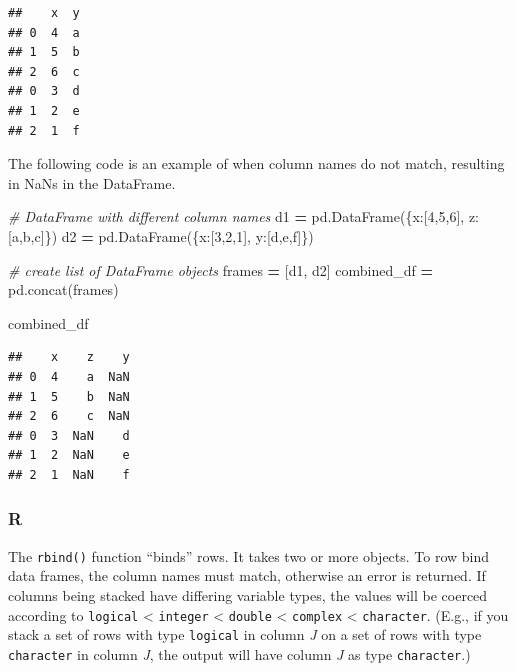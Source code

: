 \documentclass[
]{book}
\newenvironment{Shaded}{\begin{snugshade}}{\end{snugshade}}
\newcommand{\CommentTok}[1]{\textcolor[rgb]{0.56,0.35,0.01}{\textit{#1}}}
\newcommand{\DecValTok}[1]{\textcolor[rgb]{0.00,0.00,0.81}{#1}}
\newcommand{\NormalTok}[1]{#1}
\newcommand{\OperatorTok}[1]{\textcolor[rgb]{0.81,0.36,0.00}{\textbf{#1}}}
\newcommand{\StringTok}[1]{\textcolor[rgb]{0.31,0.60,0.02}{#1}}
\begin{document}
\begin{verbatim}
##    x  y
## 0  4  a
## 1  5  b
## 2  6  c
## 0  3  d
## 1  2  e
## 2  1  f
\end{verbatim}

The following code is an example of when column names do not match, resulting in NaNs in the DataFrame.

\begin{Shaded}
\begin{Highlighting}[]

\CommentTok{\# DataFrame with different column names}
\NormalTok{d1 }\OperatorTok{=}\NormalTok{ pd.DataFrame(\{}\StringTok{\textquotesingle{}x\textquotesingle{}}\NormalTok{:[}\DecValTok{4}\NormalTok{,}\DecValTok{5}\NormalTok{,}\DecValTok{6}\NormalTok{], }\StringTok{\textquotesingle{}z\textquotesingle{}}\NormalTok{:[}\StringTok{\textquotesingle{}a\textquotesingle{}}\NormalTok{,}\StringTok{\textquotesingle{}b\textquotesingle{}}\NormalTok{,}\StringTok{\textquotesingle{}c\textquotesingle{}}\NormalTok{]\})}
\NormalTok{d2 }\OperatorTok{=}\NormalTok{ pd.DataFrame(\{}\StringTok{\textquotesingle{}x\textquotesingle{}}\NormalTok{:[}\DecValTok{3}\NormalTok{,}\DecValTok{2}\NormalTok{,}\DecValTok{1}\NormalTok{], }\StringTok{\textquotesingle{}y\textquotesingle{}}\NormalTok{:[}\StringTok{\textquotesingle{}d\textquotesingle{}}\NormalTok{,}\StringTok{\textquotesingle{}e\textquotesingle{}}\NormalTok{,}\StringTok{\textquotesingle{}f\textquotesingle{}}\NormalTok{]\})}

\CommentTok{\# create list of DataFrame objects}
\NormalTok{frames }\OperatorTok{=}\NormalTok{ [d1, d2]}
\NormalTok{combined\_df }\OperatorTok{=}\NormalTok{ pd.concat(frames)}

\NormalTok{combined\_df}
\end{Highlighting}
\end{Shaded}

\begin{verbatim}
##    x    z    y
## 0  4    a  NaN
## 1  5    b  NaN
## 2  6    c  NaN
## 0  3  NaN    d
## 1  2  NaN    e
## 2  1  NaN    f
\end{verbatim}

\hypertarget{r-30}{%
\subsubsection*{R}\label{r-30}}

The \texttt{rbind()} function ``binds'' rows. It takes two or more objects. To row bind data frames, the column names must match, otherwise an error is returned. If columns being stacked have differing variable types, the values will be coerced according to \texttt{logical} \textless{} \texttt{integer} \textless{} \texttt{double} \textless{} \texttt{complex} \textless{} \texttt{character}. (E.g., if you stack a set of rows with type \texttt{logical} in column \emph{J} on a set of rows with type \texttt{character} in column \emph{J}, the output will have column \emph{J} as type \texttt{character}.)
\end{document}

